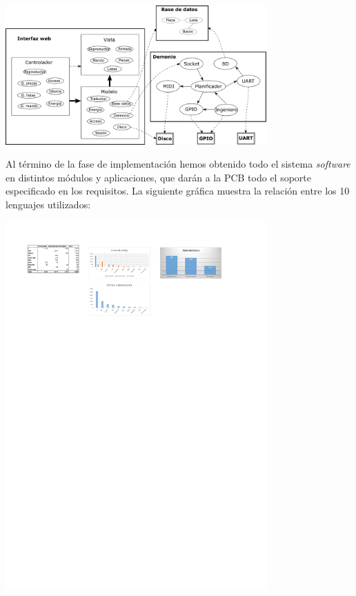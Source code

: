 \documentclass[10pt,a4paper]{article}
\begin{document}
	\begin{center}
		\includegraphics[width=0.75\textwidth]{images/sistema} 
	\end{center}
	
	Al término de la fase de implementación hemos obtenido todo el sistema \textit{software} en distintos módulos y aplicaciones, que darán a la PCB todo el soporte especificado en los requisitos. La siguiente gráfica muestra la relación entre los 10 lenguajes utilizados:
	
	\begin{center}
		\includegraphics[width=0.75\textwidth]{images/lineas_lenguajes} 
	\end{center}
	
\end{document}
